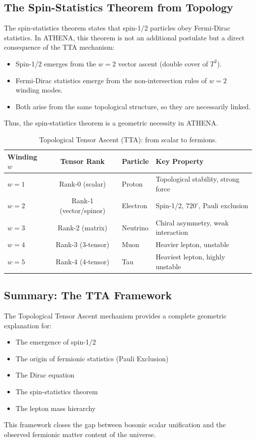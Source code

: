 \documentclass[11pt,a4paper]{article}
\begin{document}
\subsection{The Spin-Statistics Theorem from Topology}
The spin-statistics theorem states that spin-1/2 particles obey Fermi-Dirac statistics. In ATHENA, this theorem is not an additional postulate but a direct consequence of the TTA mechanism:
\begin{itemize}
\item Spin-1/2 emerges from the \(w = 2\) vector ascent (double cover of \(T^2\)).
\item Fermi-Dirac statistics emerge from the non-intersection rules of \(w = 2\) winding modes.
\item Both arise from the same topological structure, so they are necessarily linked.
\end{itemize}
Thus, the spin-statistics theorem is a geometric necessity in ATHENA.

\begin{table}[H]
\centering
\caption{Topological Tensor Ascent (TTA): from scalar to fermions.}
\begin{tabular}{lcll}
\toprule
Winding \(w\) & Tensor Rank & Particle & Key Property \\
\midrule
\(w=1\) & Rank-0 (scalar) & Proton & Topological stability, strong force \\
\(w=2\) & Rank-1 (vector/spinor) & Electron & Spin-1/2, \(720^\circ\), Pauli exclusion \\
\(w=3\) & Rank-2 (matrix) & Neutrino & Chiral asymmetry, weak interaction \\
\(w=4\) & Rank-3 (3-tensor) & Muon & Heavier lepton, unstable \\
\(w=5\) & Rank-4 (4-tensor) & Tau & Heaviest lepton, highly unstable \\
\bottomrule
\end{tabular}
\end{table}

\subsection{Summary: The TTA Framework}
The Topological Tensor Ascent mechanism provides a complete geometric explanation for:
\begin{itemize}
\item The emergence of spin-1/2
\item The origin of fermionic statistics (Pauli Exclusion)
\item The Dirac equation
\item The spin-statistics theorem
\item The lepton mass hierarchy
\end{itemize}
This framework closes the gap between bosonic scalar unification and the observed fermionic matter content of the universe.
\end{document}
